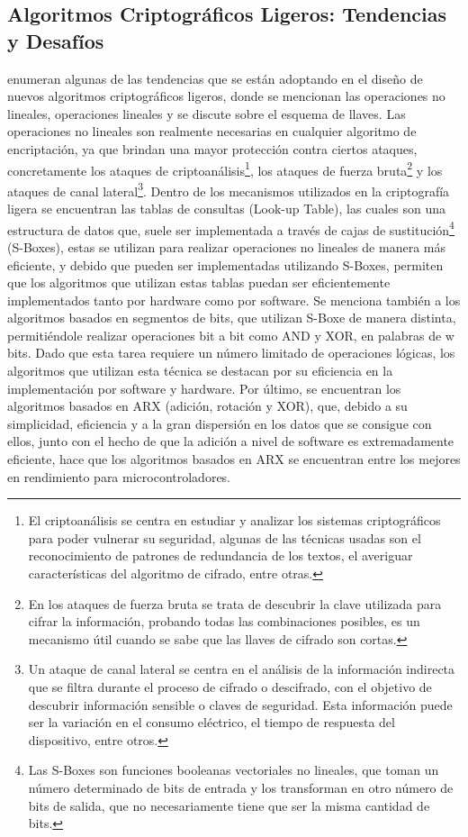 \documentclass[a4paper,10pt]{article}
\begin{document}
	\subsection{Algoritmos Criptográficos Ligeros: Tendencias y Desafíos}
	\textcite{biryukov2017state} enumeran algunas de las tendencias que se están adoptando en el diseño de nuevos algoritmos criptográficos ligeros, donde se mencionan las operaciones no lineales, operaciones lineales y se discute sobre el esquema de llaves.
	Las operaciones no lineales son realmente necesarias en cualquier algoritmo de encriptación, ya que brindan una mayor protección contra ciertos ataques, concretamente los ataques de criptoanálisis\footnote{El criptoanálisis se centra en estudiar y analizar los sistemas criptográficos para poder vulnerar su seguridad, algunas de las técnicas usadas son el reconocimiento de patrones de redundancia de los textos, el averiguar características del algoritmo de cifrado, entre otras.}, los ataques de fuerza bruta\footnote{En los ataques de fuerza bruta se trata de descubrir la clave utilizada para cifrar la información, probando todas las combinaciones posibles, es un mecanismo útil cuando se sabe que las llaves de cifrado son cortas.} y los ataques de canal lateral\footnote{Un ataque de canal lateral se centra en el análisis de la información indirecta que se filtra durante el proceso de cifrado o descifrado, con el objetivo de descubrir información sensible o claves de seguridad. Esta información puede ser la variación en el consumo eléctrico, el tiempo de respuesta del dispositivo, entre otros.}. Dentro de los mecanismos utilizados en la criptografía ligera se encuentran las tablas de consultas (Look-up Table), las cuales son una estructura de datos que, suele ser implementada a través de cajas de sustitución\footnote{Las S-Boxes son funciones booleanas vectoriales no lineales, que toman un número determinado de bits de entrada y los transforman en otro número de bits de salida, que no necesariamente tiene que ser la misma cantidad de bits.} (S-Boxes), estas se utilizan para realizar operaciones no lineales de manera más eficiente, y debido que pueden ser implementadas utilizando S-Boxes, permiten que los algoritmos que utilizan estas tablas puedan ser eficientemente implementados tanto por hardware como por software. Se menciona también a los algoritmos basados en segmentos de bits, que utilizan S-Boxe de manera distinta, permitiéndole realizar operaciones bit a bit como AND y XOR, en palabras de w bits. Dado que esta tarea requiere un número limitado de operaciones lógicas, los algoritmos que utilizan esta técnica se destacan por su eficiencia en la implementación por software y hardware. Por último, se encuentran los algoritmos basados en ARX (adición, rotación y XOR), que, debido a su simplicidad, eficiencia y a la gran dispersión en los datos que se consigue con ellos, junto con el hecho de que la adición a nivel de software es extremadamente eficiente, hace que los algoritmos basados en ARX se encuentran entre los mejores en rendimiento para microcontroladores.
\end{document}
